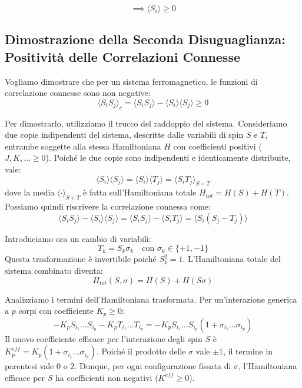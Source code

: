 \begin{equation}
\implies \langle S_i \rangle \ge 0
\end{equation}


\subsection{Dimostrazione della Seconda Disuguaglianza: Positività delle Correlazioni Connesse}

Vogliamo dimostrare che per un sistema ferromagnetico, le funzioni di correlazione connesse sono non negative:
\begin{equation}
\langle S_i S_j \rangle_c = \langle S_i S_j \rangle - \langle S_i \rangle \langle S_j \rangle \ge 0
\end{equation}

Per dimostrarlo, utilizziamo il trucco del raddoppio del sistema. Consideriamo due copie indipendenti del sistema, descritte dalle variabili di spin $S$ e $T$, entrambe soggette alla stessa Hamiltoniana $H$ con coefficienti positivi ($J, K, \dots \ge 0$).
Poiché le due copie sono indipendenti e identicamente distribuite, vale:
\begin{equation}
\langle S_i \rangle \langle S_j \rangle = \langle S_i \rangle \langle T_j \rangle = \langle S_i T_j \rangle_{S+T}
\end{equation}
dove la media $\langle \cdot \rangle_{S+T}$ è fatta sull'Hamiltoniana totale $H_{tot} = H(S) + H(T)$.
Possiamo quindi riscrivere la correlazione connessa come:
\begin{equation}
\langle S_i S_j \rangle - \langle S_i \rangle \langle S_j \rangle = \langle S_i S_j \rangle - \langle S_i T_j \rangle = \langle S_i (S_j - T_j) \rangle
\end{equation}

\noindent Introduciamo ora un cambio di variabili:
\begin{equation}
T_k = S_k \sigma_k \quad \text{con } \sigma_k \in \{+1, -1\}
\end{equation}
Questa trasformazione è invertibile poiché $S_k^2 = 1$.
L'Hamiltoniana totale del sistema combinato diventa:
\begin{equation}
H_{tot}(S, \sigma) = H(S) + H(S\sigma)
\end{equation}

\noindent Analizziamo i termini dell'Hamiltoniana trasformata. Per un'interazione generica a $p$ corpi con coefficiente $K_p \ge 0$:
\begin{equation}
- K_p S_{i_1} \dots S_{i_p} - K_p T_{i_1} \dots T_{i_p} = - K_p S_{i_1} \dots S_{i_p} (1 + \sigma_{i_1} \dots \sigma_{i_p})
\end{equation}
Il nuovo coefficiente efficace per l'interazione degli spin $S$ è $K^{eff}_p = K_p (1 + \sigma_{i_1} \dots \sigma_{i_p})$.
Poiché il prodotto delle $\sigma$ vale $\pm 1$, il termine in parentesi vale $0$ o $2$.
Dunque, per ogni configurazione fissata di $\sigma$, l'Hamiltoniana efficace per $S$ ha coefficienti non negativi ($K^{eff} \ge 0$).

